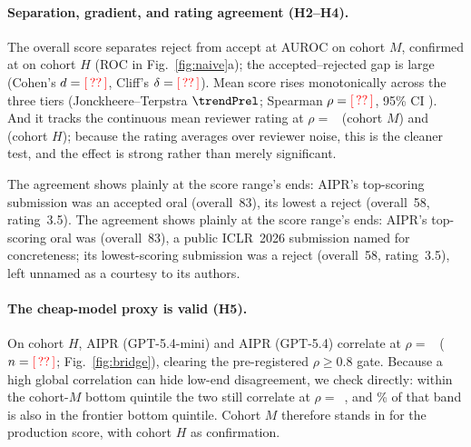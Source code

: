 \begin{table}[t]
  \centering
  \caption{Reject rate, lift over base rate, and oral-paper share by AIPR-score quintile
  (cohort $M$). Band Q1 is the lowest-scoring fifth.}
  \label{tab:bands}
  
\end{table}

\paragraph{Separation, gradient, and rating agreement (H2--H4).}
The overall score separates reject from accept at AUROC \aurocMiniFull on cohort $M$,
confirmed at \aurocFullFull on cohort $H$ (ROC in Fig.~\ref{fig:naive}a); the
accepted--rejected gap is large (Cohen's $d=\textcolor{red}{[\,??\,]}$, Cliff's
$\delta=\textcolor{red}{[\,??\,]}$). Mean score rises monotonically across the three tiers
(Jonckheere--Terpstra $\trendPrel$; Spearman $\rho=\textcolor{red}{[\,??\,]}$, 95\% CI \trendRhoCI). And
it tracks the continuous mean reviewer rating at $\rho =$~\spearmanRatingMiniFull{} (cohort
$M$) and \spearmanRatingFullFull{} (cohort $H$); because the rating averages over reviewer
noise, this is the cleaner test, and the effect is strong rather than merely significant.

\ifanonymous
The agreement shows plainly at the score range's ends: AIPR's top-scoring submission was
an accepted oral (overall~83), its lowest a reject (overall~58, rating~3.5).
\else
The agreement shows plainly at the score range's ends: AIPR's top-scoring oral was
\citet{astabench2026} (overall~83), a public ICLR~2026 submission named for
concreteness; its lowest-scoring submission was a reject (overall~58, rating~3.5),
left unnamed as a courtesy to its authors.
\fi

\paragraph{The cheap-model proxy is valid (H5).}
On cohort $H$, AIPR (GPT-5.4-mini) and AIPR (GPT-5.4) correlate at $\rho =$~\bridgeRhoFull{}
($n=\textcolor{red}{[\,??\,]}$; Fig.~\ref{fig:bridge}), clearing the pre-registered $\rho\ge0.8$ gate.
Because a high global correlation can hide low-end disagreement, we check directly:
within the cohort-$M$ bottom quintile the two still correlate at $\rho =$~\bridgeLowRhoFull{},
and \bridgeOverlap\% of that band is also in the frontier bottom quintile. Cohort $M$
therefore stands in for the production score, with cohort $H$ as confirmation.

